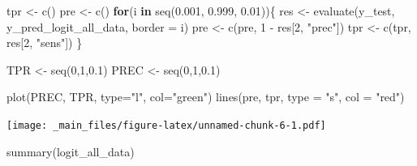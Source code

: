 \documentclass[a4paper, nobind]{templates/ociamthesis}
\newenvironment{Shaded}{\begin{snugshade}}{\end{snugshade}}
\newcommand{\AttributeTok}[1]{\textcolor[rgb]{0.77,0.63,0.00}{#1}}
\newcommand{\ControlFlowTok}[1]{\textcolor[rgb]{0.13,0.29,0.53}{\textbf{#1}}}
\newcommand{\DecValTok}[1]{\textcolor[rgb]{0.00,0.00,0.81}{#1}}
\newcommand{\FloatTok}[1]{\textcolor[rgb]{0.00,0.00,0.81}{#1}}
\newcommand{\FunctionTok}[1]{\textcolor[rgb]{0.00,0.00,0.00}{#1}}
\newcommand{\NormalTok}[1]{#1}
\newcommand{\OtherTok}[1]{\textcolor[rgb]{0.56,0.35,0.01}{#1}}
\newcommand{\SpecialCharTok}[1]{\textcolor[rgb]{0.00,0.00,0.00}{#1}}
\newcommand{\StringTok}[1]{\textcolor[rgb]{0.31,0.60,0.02}{#1}}
\renewenvironment{Shaded}
{
  \vspace{10pt}%
  \begin{snugshade}%
}{%
  \end{snugshade}%
  \vspace{8pt}%
}
\begin{document}
\begin{Shaded}
\begin{Highlighting}[]
\NormalTok{tpr }\OtherTok{\textless{}{-}} \FunctionTok{c}\NormalTok{()}
\NormalTok{pre }\OtherTok{\textless{}{-}} \FunctionTok{c}\NormalTok{()}
\ControlFlowTok{for}\NormalTok{(i }\ControlFlowTok{in} \FunctionTok{seq}\NormalTok{(}\FloatTok{0.001}\NormalTok{, }\FloatTok{0.999}\NormalTok{, }\FloatTok{0.01}\NormalTok{))\{}
\NormalTok{  res }\OtherTok{\textless{}{-}} \FunctionTok{evaluate}\NormalTok{(y\_test, y\_pred\_logit\_all\_data, }\AttributeTok{border =}\NormalTok{ i)}
\NormalTok{  pre }\OtherTok{\textless{}{-}} \FunctionTok{c}\NormalTok{(pre, }\DecValTok{1} \SpecialCharTok{{-}}\NormalTok{ res[}\DecValTok{2}\NormalTok{, }\StringTok{"prec"}\NormalTok{])}
\NormalTok{  tpr }\OtherTok{\textless{}{-}} \FunctionTok{c}\NormalTok{(tpr, res[}\DecValTok{2}\NormalTok{, }\StringTok{"sens"}\NormalTok{])}
\NormalTok{\}}

\NormalTok{TPR }\OtherTok{\textless{}{-}} \FunctionTok{seq}\NormalTok{(}\DecValTok{0}\NormalTok{,}\DecValTok{1}\NormalTok{,}\FloatTok{0.1}\NormalTok{)}
\NormalTok{PREC }\OtherTok{\textless{}{-}} \FunctionTok{seq}\NormalTok{(}\DecValTok{0}\NormalTok{,}\DecValTok{1}\NormalTok{,}\FloatTok{0.1}\NormalTok{)}

\FunctionTok{plot}\NormalTok{(PREC, TPR, }\AttributeTok{type=}\StringTok{"l"}\NormalTok{, }\AttributeTok{col=}\StringTok{"green"}\NormalTok{)}
\FunctionTok{lines}\NormalTok{(pre, tpr, }\AttributeTok{type =} \StringTok{"s"}\NormalTok{, }\AttributeTok{col =} \StringTok{"red"}\NormalTok{)}
\end{Highlighting}
\end{Shaded}

\texttt{[image: \_main\_files/figure-latex/unnamed-chunk-6-1.pdf]}

\begin{Shaded}
\begin{Highlighting}[]
\FunctionTok{summary}\NormalTok{(logit\_all\_data)}
\end{Highlighting}
\end{Shaded}
\end{document}
